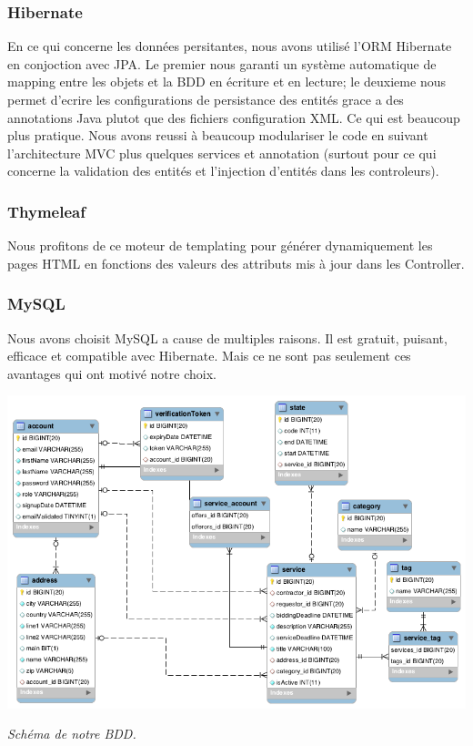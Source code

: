 \subsubsection{Hibernate}
En ce qui concerne les données persitantes, nous avons utilisé l'ORM Hibernate en conjoction avec JPA. Le premier nous garanti un système automatique de mapping entre les objets et la BDD en écriture et en lecture; le deuxieme nous permet d'ecrire les configurations de persistance des entités grace a des annotations Java plutot que des fichiers configuration XML. Ce qui est beaucoup plus pratique.
Nous avons reussi à beaucoup modulariser le code en suivant l'architecture MVC plus quelques services et annotation (surtout pour ce qui concerne la validation des entités et l'injection d'entités dans les controleurs).

\subsubsection{Thymeleaf}
Nous profitons de ce moteur de templating pour générer dynamiquement les pages HTML en fonctions des valeurs des attributs mis à jour dans les Controller.

\subsubsection{MySQL}
Nous avons choisit MySQL a cause de multiples raisons. Il est gratuit, puisant, efficace et compatible avec Hibernate.
Mais ce ne sont pas seulement ces avantages qui ont motivé notre choix.

\includegraphics[width=\linewidth]{schemaBDD.png}
\begin{center}
\textit{Schéma de notre BDD.}
\end{center}

